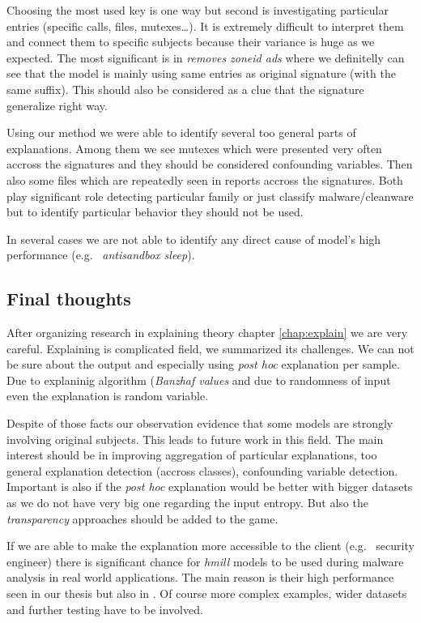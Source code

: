 Choosing the most used key is one way but second is investigating particular entries (specific calls, files, mutexes\dots). It is extremely difficult to interpret them and connect them to specific subjects because their variance is huge as we expected. The most significant is in \emph{removes zoneid ads} where we definitelly can see that the model is mainly using same entries as original signature (with the same suffix). This should also be considered as a clue that the signature generalize right way.

Using our method we were able to identify several too general parts of explanations. Among them we see mutexes which were presented very often accross the signatures and they should be considered confounding variables. Then also some files which are repeatedly seen in reports accross the signatures. Both play significant role detecting particular family or just classify malware/cleanware but to identify particular behavior they should not be used.

In several cases we are not able to identify any direct cause of model's high performance (e.g. \ \emph{antisandbox sleep}).


\subsection{Final thoughts}
After organizing research in explaining theory chapter \ref{chap:explain} we are very careful. Explaining is complicated field, we summarized its challenges. We can not be sure about the output and especially using \emph{post hoc} explanation per sample. Due to explaninig algorithm (\emph{Banzhaf values} and due to randomness of input even the explanation is random variable. 

Despite of those facts our observation evidence that some models are strongly involving original subjects. This leads to future work in this field. The main interest should be in improving aggregation of particular explanations, too general explanation detection (accross classes), confounding variable detection. Important is also if the \emph{post hoc} explanation would be better with bigger datasets as we do not have very big one regarding the input entropy. But also the \emph{transparency} approaches should be added to the game. 

If we are able to make the explanation more accessible to the client (e.g. \ security engineer) there is significant chance for \emph{hmill} models to be used during malware analysis in real world applications. The main reason is their high performance seen in our thesis but also in \cite{Mandlik2020} . Of course more complex examples, wider datasets and further testing have to be involved.

